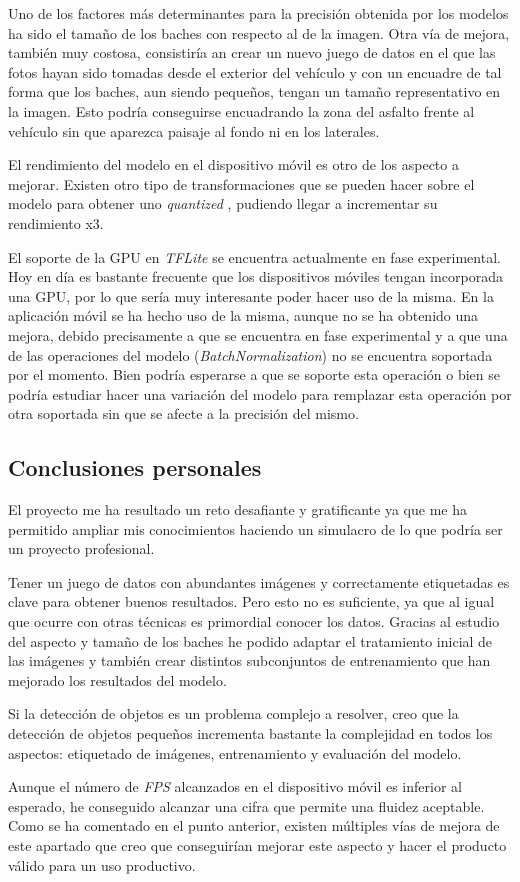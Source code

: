 Uno de los factores más determinantes para la precisión obtenida por los modelos ha sido el tamaño de los baches con respecto al de la imagen. Otra vía de mejora, también muy costosa, consistiría an crear un nuevo juego de datos en el que las fotos hayan sido tomadas desde el exterior del vehículo y con un encuadre de tal forma que los baches, aun siendo pequeños, tengan un tamaño representativo en la imagen. Esto podría conseguirse encuadrando la zona del asfalto frente al vehículo sin que aparezca paisaje al fondo ni en los laterales.

El rendimiento del modelo en el dispositivo móvil es otro de los aspecto a mejorar. Existen otro tipo de transformaciones que se pueden hacer sobre el modelo para obtener uno \textit{quantized} \cite{s8_quantizedmodel}, pudiendo llegar a incrementar su rendimiento x3.

El soporte de la GPU en \textit{TFLite} se encuentra actualmente en fase experimental. Hoy en día es bastante frecuente que los dispositivos móviles tengan incorporada una GPU, por lo que sería muy interesante poder hacer uso de la misma. En la aplicación móvil se ha hecho uso de la misma, aunque no se ha obtenido una mejora, debido precisamente a que se encuentra en fase experimental y a que una de las operaciones del modelo (\textit{BatchNormalization}) \cite{s8_batchnormalization} no se encuentra soportada por el momento. Bien podría esperarse a que se soporte esta operación o bien se podría estudiar hacer una variación del modelo para remplazar esta operación por otra soportada sin que se afecte a la precisión del mismo.

\subsection{Conclusiones personales}

El proyecto me ha resultado un reto desafiante y gratificante ya que me ha permitido ampliar mis conocimientos haciendo un simulacro de lo que podría ser un proyecto profesional.

Tener un juego de datos con abundantes imágenes y correctamente etiquetadas es clave para obtener buenos resultados. Pero esto no es suficiente, ya que al igual que ocurre con otras técnicas es primordial conocer los datos. Gracias al estudio del aspecto y tamaño de los baches he podido adaptar el tratamiento inicial de las imágenes y también crear distintos subconjuntos de entrenamiento que han mejorado los resultados del modelo.

Si la detección de objetos es un problema complejo a resolver, creo que la detección de objetos pequeños incrementa bastante la complejidad en todos los aspectos: etiquetado de imágenes, entrenamiento y evaluación del modelo.

Aunque el número de \textit{FPS} alcanzados en el dispositivo móvil es inferior al esperado, he conseguido alcanzar una cifra que permite una fluidez aceptable. Como se ha comentado en el punto anterior, existen múltiples vías de mejora de este apartado que creo que conseguirían mejorar este aspecto y hacer el producto válido para un uso productivo.